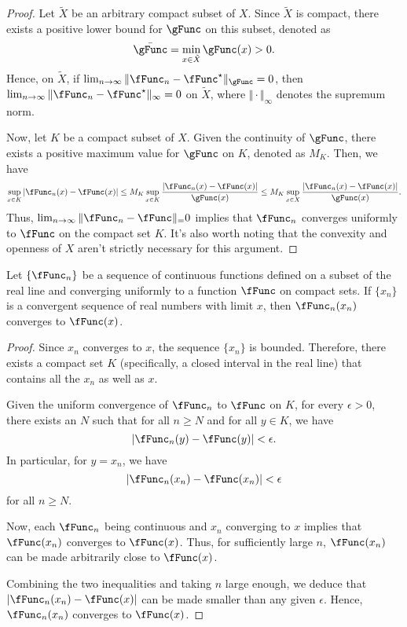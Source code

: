 \documentclass[\econtexRoot/BufferStockTheory]{subfiles}
\begin{document}
\begin{proof}
Let $\tilde{X}$ be an arbitrary compact subset of $X$.
Since $\tilde{X}$ is compact, there exists a positive lower bound for $\gFunc$ on this subset, denoted as 
\begin{equation}
\bar{\gFunc} = \min_{x \in \tilde{X}} \gFunc(x) > 0.
\end{equation}
Hence, on $\tilde{X}$, if $\lim_{n \to \infty} \Vert \fFunc_n - \fFunc^{\star} \Vert_\gFunc = 0$, then $\lim_{n \to \infty} \Vert \fFunc_n - \fFunc^{\star} \Vert_\infty = 0$ on $\tilde{X}$, where $\Vert \cdot \Vert_\infty$ denotes the supremum norm.


Now, let $K$ be a compact subset of $X$.
Given the continuity of $\gFunc$, there exists a positive maximum value for $\gFunc$ on $K$, denoted as $M_K$.
Then, we have
\begin{equation}
\sup_{x \in K} \vert \fFunc_n(x) - \fFunc(x)\vert  \leq M_K \sup_{x \in K} \frac{\vert \fFunc_n(x) - \fFunc(x)\vert }{\gFunc(x)} \leq M_K \sup_{x \in X} \frac{\vert \fFunc_n(x) - \fFunc(x)\vert }{\gFunc(x)}.
\end{equation}
Thus, $\lim_{n \to \infty} \Vert \fFunc_n - \fFunc \Vert_  = 0$ implies that $\fFunc_n$ converges uniformly to $\fFunc$ on the compact set $K$.
It's also worth noting that the convexity and openness of $X$ aren't strictly necessary for this argument.
\end{proof}

\begin{fact}\label{fact:compactnts}
Let $\{\fFunc_n\}$ be a sequence of continuous functions defined on a subset of the real line and converging uniformly to a function $\fFunc$ on compact sets. If $\{x_n\}$ is a convergent sequence of real numbers with limit $x$, then $\fFunc_n(x_n)$ converges to $\fFunc(x)$.
\end{fact}

\begin{proof}
Since $x_n$ converges to $x$, the sequence $\{x_n\}$ is bounded.
Therefore, there exists a compact set $K$ (specifically, a closed interval in the real line) that contains all the $x_n$ as well as $x$.

Given the uniform convergence of $\fFunc_n$ to $\fFunc$ on $K$, for every $\epsilon > 0$, there exists an $N$ such that for all $n \geq N$ and for all $y \in K$, we have
\[ \vert \fFunc_n(y) - \fFunc(y)\vert  < \epsilon.
\]
In particular, for $y = x_n$, we have
\[ \vert \fFunc_n(x_n) - \fFunc(x_n)\vert  < \epsilon \]
for all $n \geq N$.

Now, each $\fFunc_n$ being continuous and $x_n$ converging to $x$ implies that $\fFunc(x_n)$ converges to $\fFunc(x)$.
Thus, for sufficiently large $n$, $\fFunc(x_n)$ can be made arbitrarily close to $\fFunc(x)$.

Combining the two inequalities and taking $n$ large enough, we deduce that $\vert \fFunc_n(x_n) - \fFunc(x)\vert$ can be made smaller than any given $\epsilon$.
Hence, $\fFunc_n(x_n)$ converges to $\fFunc(x)$.
\end{proof}
\end{document}
